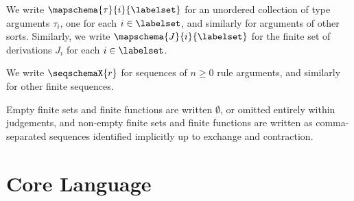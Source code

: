 We write $\mapschema{\tau}{i}{\labelset}$ for an unordered collection of type arguments $\tau_i$, one for each $i\in \labelset$, and similarly for arguments of other sorts. Similarly, we write $\mapschema{J}{i}{\labelset}$ for the finite set of derivations $J_i$ for each $i \in \labelset$.

We write $\seqschemaX{r}$ for sequences of $n \geq 0$ rule arguments, and similarly for other finite sequences. 

Empty finite sets and finite functions are written $\emptyset$, or omitted entirely within judgements, and non-empty finite sets and finite functions are written as comma-separated sequences identified implicitly up to exchange and contraction.


\section{Core Language}\label{appendix:SES-XL}
